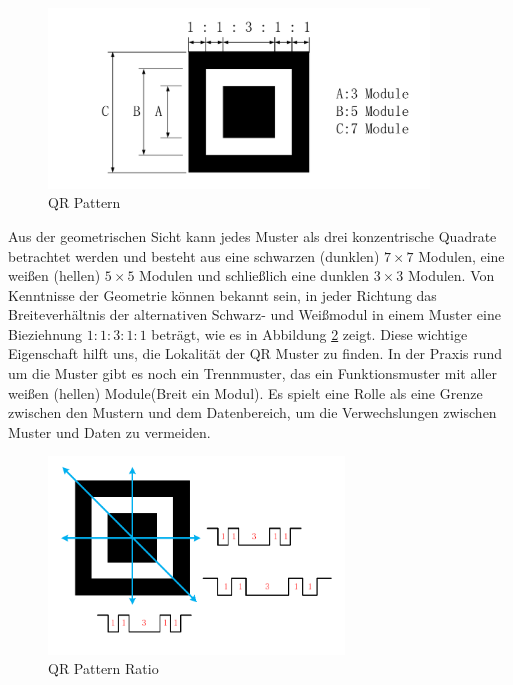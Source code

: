 \begin{figure}[H]
 \centering 
 \includegraphics[keepaspectratio,width=0.9\textwidth]{images/3_Ersteverfahren/QRMuster/QRPattern.pdf}
 \caption{QR Pattern}
 \label{fig:QRPattern}
\end{figure}

Aus der geometrischen Sicht kann jedes Muster als drei konzentrische Quadrate betrachtet werden und besteht aus eine schwarzen (dunklen) $7 \times 7$ Modulen, eine weißen (hellen) $5 \times 5$ Modulen und schließlich eine dunklen $3 \times 3$ Modulen. Von Kenntnisse der Geometrie können bekannt sein, in jeder Richtung das Breiteverhältnis der alternativen Schwarz- und Weißmodul in einem Muster eine Bieziehnung $1:1:3:1:1$ beträgt, wie es in Abbildung \ref{fig:QRPatternRatio} zeigt. Diese wichtige Eigenschaft hilft uns, die Lokalität der QR Muster zu finden. In der Praxis rund um die Muster gibt es noch ein Trennmuster, das ein Funktionsmuster mit aller weißen (hellen) Module(Breit ein Modul). Es spielt eine Rolle als eine Grenze zwischen den Mustern und dem Datenbereich, um die Verwechslungen zwischen Muster und Daten zu vermeiden.
 
 \begin{figure}[H]
 \centering 
 \includegraphics[keepaspectratio,width=0.7\textwidth]{images/3_Ersteverfahren/QRMuster/QP_Patternratio.pdf}
 \caption{QR Pattern Ratio}
 \label{fig:QRPatternRatio}
\end{figure}

